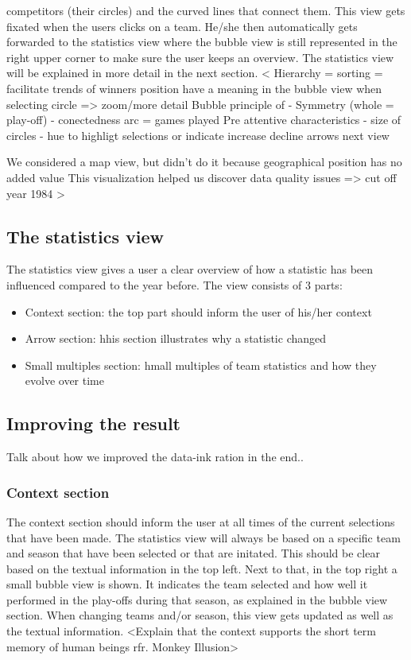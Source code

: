 \documentclass{sigchi}
\begin{document}
competitors (their circles) and the curved lines that connect them. This view gets 
fixated when the users clicks on a team.
He/she then automatically gets forwarded to the statistics view where the bubble 
view is still represented in the right upper corner to make sure the user keeps
an overview. The statistics view will be explained in more detail in the next section.
< Hierarchy = sorting = facilitate trends of winners
position have a meaning in the bubble view
when selecting circle => zoom/more detail
Bubble principle of 
- Symmetry (whole = play-off)
- conectedness arc = games played
Pre attentive characteristics
- size of circles
- hue to highligt selections or indicate increase decline arrows next view

We considered a map view, but didn't do it because geographical position has no added value
This visualization helped us discover data quality issues => cut off year 1984
>


\subsection{The statistics view}
The statistics view gives a user a clear overview of how a statistic has been influenced compared to the year before. The view consists of 3 parts:
\begin{itemize}
    \item Context section: the top part should inform the user of his/her
        context
    \item Arrow section: hhis section illustrates why a statistic changed
    \item Small multiples section: hmall multiples of team statistics and how they evolve over time
\end{itemize}

\subsection{Improving the result}
Talk about how we improved the data-ink ration in the end..

\subsubsection{Context section}
The context section should inform the user at all times of the current selections 
that have been made. The statistics view will always be based on a specific team
and season that have been selected or that are initated. This should be clear based
on the textual information in the top left. Next to that, in the top right a small 
bubble view is shown. It indicates the team selected and how well it performed in 
the play-offs during that season, as explained in the bubble view section. When changing teams and/or season, this view gets 
updated as well as the textual information.
<Explain that the context supports the short term memory of human beings rfr. Monkey Illusion>
\end{document}
